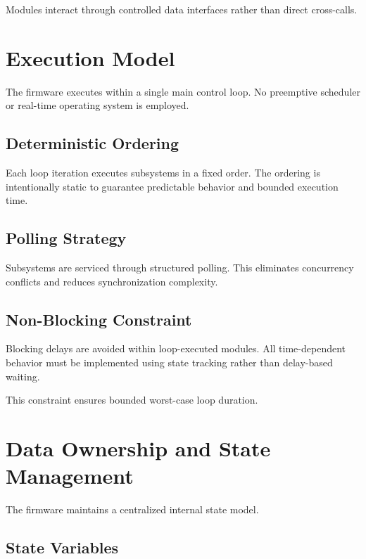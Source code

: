 Modules interact through controlled data interfaces rather than direct cross-calls.


\section{Execution Model}

The firmware executes within a single main control loop.  
No preemptive scheduler or real-time operating system is employed.

\subsection{Deterministic Ordering}

Each loop iteration executes subsystems in a fixed order.  
The ordering is intentionally static to guarantee predictable behavior and bounded execution time.

\subsection{Polling Strategy}

Subsystems are serviced through structured polling.  
This eliminates concurrency conflicts and reduces synchronization complexity.

\subsection{Non-Blocking Constraint}

Blocking delays are avoided within loop-executed modules.  
All time-dependent behavior must be implemented using state tracking rather than delay-based waiting.

This constraint ensures bounded worst-case loop duration.


\section{Data Ownership and State Management}

The firmware maintains a centralized internal state model.

\subsection{State Variables}

